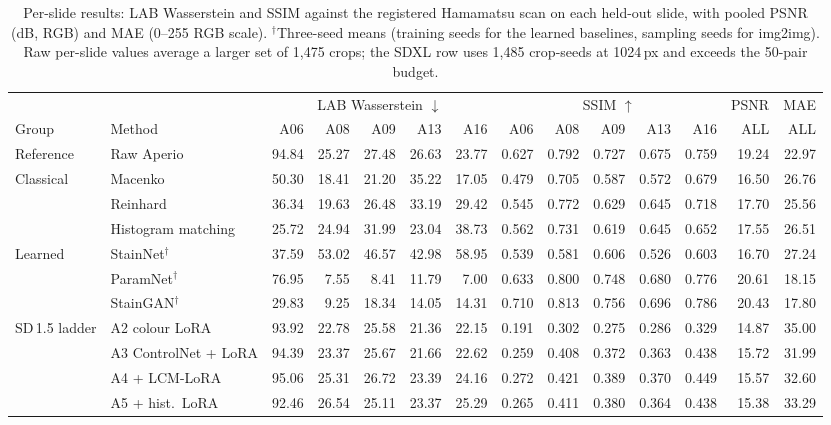 \begin{table}[!tbp]
\centering
\caption{Per-slide \AtoH{} results: LAB Wasserstein and SSIM against the registered Hamamatsu scan on each held-out
slide, with pooled PSNR (dB, RGB) and MAE (0--255 RGB scale). $^\dagger$Three-seed means (training seeds for the learned
baselines, sampling seeds for img2img). Raw per-slide values average a larger set of 1{,}475 crops; the SDXL row
uses 1{,}485 crop-seeds at 1024\,px and exceeds the 50-pair budget.}
\label{tab:app-perslide}
\scriptsize
\setlength{\tabcolsep}{3pt}
\begin{tabular}{llrrrrrrrrrrrr}
\toprule
& & \multicolumn{5}{c}{LAB Wasserstein $\downarrow$} & \multicolumn{5}{c}{SSIM $\uparrow$} & PSNR & MAE\\
\cmidrule(lr){3-7}\cmidrule(lr){8-12}
Group & Method & A06 & A08 & A09 & A13 & A16 & A06 & A08 & A09 & A13 & A16 & ALL & ALL\\
\midrule
Reference & Raw Aperio & 94.84 & 25.27 & 27.48 & 26.63 & 23.77 & 0.627 & 0.792 & 0.727 & 0.675 & 0.759 & 19.24 & 22.97\\
\midrule
Classical & Macenko & 50.30 & 18.41 & 21.20 & 35.22 & 17.05 & 0.479 & 0.705 & 0.587 & 0.572 & 0.679 & 16.50 & 26.76\\
 & Reinhard & 36.34 & 19.63 & 26.48 & 33.19 & 29.42 & 0.545 & 0.772 & 0.629 & 0.645 & 0.718 & 17.70 & 25.56\\
 & Histogram matching & 25.72 & 24.94 & 31.99 & 23.04 & 38.73 & 0.562 & 0.731 & 0.619 & 0.645 & 0.652 & 17.55 & 26.51\\
\midrule
Learned & StainNet$^\dagger$ & 37.59 & 53.02 & 46.57 & 42.98 & 58.95 & 0.539 & 0.581 & 0.606 & 0.526 & 0.603 & 16.70 & 27.24\\
 & ParamNet$^\dagger$ & 76.95 & 7.55 & 8.41 & 11.79 & 7.00 & 0.633 & 0.800 & 0.748 & 0.680 & 0.776 & 20.61 & 18.15\\
 & StainGAN$^\dagger$ & 29.83 & 9.25 & 18.34 & 14.05 & 14.31 & 0.710 & 0.813 & 0.756 & 0.696 & 0.786 & 20.43 & 17.80\\
\midrule
SD\,1.5 ladder & A2 colour LoRA & 93.92 & 22.78 & 25.58 & 21.36 & 22.15 & 0.191 & 0.302 & 0.275 & 0.286 & 0.329 & 14.87 & 35.00\\
 & A3 ControlNet + LoRA & 94.39 & 23.37 & 25.67 & 21.66 & 22.62 & 0.259 & 0.408 & 0.372 & 0.363 & 0.438 & 15.72 & 31.99\\
 & A4 + LCM-LoRA & 95.06 & 25.31 & 26.72 & 23.39 & 24.16 & 0.272 & 0.421 & 0.389 & 0.370 & 0.449 & 15.57 & 32.60\\
 & A5 + hist.\ LoRA & 92.46 & 26.54 & 25.11 & 23.37 & 25.29 & 0.265 & 0.411 & 0.380 & 0.364 & 0.438 & 15.38 & 33.29\\

\end{tabular}
\end{table}
